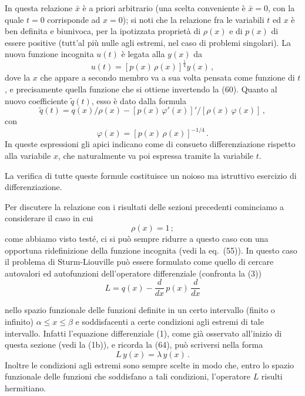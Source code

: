 \documentclass[11pt, a4paper]{book}
\numberwithin{equation}{section}
\begin{document}
In questa relazione $\bar{x}$ è a priori arbitrario (una scelta
conveniente è $\bar{x}=0$, con la quale $t=0$ corrisponde ad $x=0$); si noti
che la relazione fra le variabili $t$ ed $x$ è ben definita e biunivoca, per
la ipotizzata proprietà di $\rho(x)$ e di $p(x)$ di essere positive (tutt'al più
nulle agli estremi, nel caso di problemi singolari). La nuova funzione
incognita $u(t)$ è legata alla $y(x)$ da
\begin{equation}
u(t) = \left[p(x)\, \rho(x)\right]^{\frac{1}{4}} y(x) \,, \tag{61}
\end{equation}
dove la $x$ che appare a secondo membro va a sua volta pensata come
funzione di $t$, e precisamente quella funzione che si ottiene invertendo
la (60). Quanto al nuovo coefficiente $\tilde{q}(t)$, esso è dato dalla formula
\begin{equation}
\tilde{q}(t) = q(x)/\rho(x) - \left[p(x)\, \varphi'(x)\right]' \Big/ \left[\rho(x)\, \varphi(x)\right] \,, \tag{62}
\end{equation}
con
\begin{equation}
\varphi(x) = \left[p(x)\, \rho(x)\right]^{-1/4} \,. \tag{63}
\end{equation}
In queste espressioni gli apici indicano come di consueto differenziazione
rispetto alla variabile $x$, che naturalmente va poi espressa tramite la
variabile $t$.

La verifica di tutte queste formule costituisce un noioso ma
istruttivo esercizio di differenziazione.

Per discutere la relazione con i risultati delle sezioni precedenti
cominciamo a considerare il caso in cui
\begin{equation}
\rho(x) = 1 \,; \tag{64}
\end{equation}
come abbiamo visto testé, ci si può sempre ridurre a questo caso con
una opportuna ridefinizione della funzione incognita (vedi la eq.\ (55)). In
questo caso il problema di Sturm-Liouville può essere formulato come
quello di cercare autovalori ed autofunzioni dell'operatore differenziale
(confronta la (3))
\begin{equation}
L = q(x) - \frac{d}{dx}\, p(x)\, \frac{d}{dx} \tag{65}
\end{equation}


nello spazio funzionale delle funzioni definite in un certo intervallo (finito o infinito) $\alpha \leq x \leq \beta$ e soddisfacenti a certe condizioni
agli estremi di tale intervallo. Infatti l'equazione differenziale (1), come
già osservato all'inizio di questa sezione (vedi la (1b)), e ricorda la (64),
può scriversi nella forma
\begin{equation}
L\, y(x) = \lambda\, y(x) \,. \tag{66}
\end{equation}
Inoltre le condizioni agli estremi sono sempre scelte in modo che, entro
lo spazio funzionale delle funzioni che soddisfano a tali condizioni, l'operatore $L$ risulti hermitiano.
\end{document}
